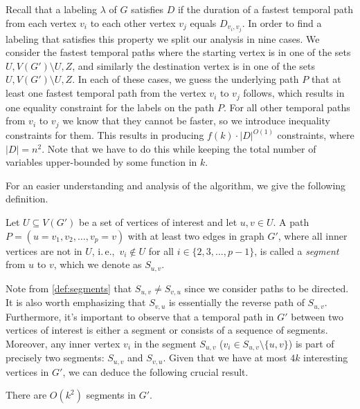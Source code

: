 \documentclass[a4paper,UKenglish,cleveref, autoref, thm-restate]{lipics-v2021}
\newcommand{\ie}{i.\,e.,\ }
\newcommand{\deltaExact}{\textsc{Simple TGR}}
\begin{document}
Recall that a labeling $\lambda$ of $G$ satisfies $D$ if the duration of a fastest temporal path from each vertex $v_i$ to each other vertex $v_j$ equals $D_{v_i, v_j}$.
In order to find a labeling that satisfies this property we split our analysis in nine cases.
We consider the fastest temporal paths 
where the starting vertex is in one of the sets $U,V(G') \setminus U, Z$,
and similarly the destination vertex is in one of the sets $U,V(G') \setminus U, Z$.
In each of these cases, we guess the underlying path $P$ that at least one fastest temporal path from the vertex $v_i$ to $v_j$ follows, 
which results in one equality constraint for the labels on the path $P$. 
For all other temporal paths from $v_i$ to $v_j$ we know that they cannot be faster, so we introduce inequality constraints for them.
This results in producing $f(k) \cdot |D| ^ {O(1)}$ constraints, where $|D|= n^2$. 
Note that we have to do this while keeping the total number of variables upper-bounded by some function in $k$.

For an easier understanding and analysis of the algorithm, we give the following definition.
\begin{definition}\label{def:segments}
    Let $U \subseteq V(G')$ be a set of vertices of interest and let $u,v \in U$.
    A path $P = (u=v_1,v_2, \dots, v_p = v)$  with at least two edges in graph $G'$, where all inner vertices are not in $U$, \ie $v_i \notin U$ for all $i \in \{ 2, 3, \dots, p-1\}$,
    is called a \emph{segment} from $u$ to $v$, which we denote as $S_{u,v}$.
\end{definition}
Note from \cref{def:segments} that $S_{u,v} \neq S_{v,u}$ since we consider paths to be directed. It is also worth emphasizing that $S_{v,u}$ is essentially the reverse path of $S_{u,v}$.
Furthermore, it's important to observe that a temporal path in $G'$ between two vertices of interest is either a segment or consists of a sequence of segments.
Moreover, any inner vertex $v_i$ in the segment $S_{u,v}$ ($v_i \in S_{u,v} \setminus \{u,v\}$) is part of precisely two segments: $S_{u,v}$ and $S_{v,u}$.
Given that we have at most $4k$ interesting vertices in $G'$, we can deduce the following crucial result.
\begin{corollary}\label{obs:FPT-k2segments}
    There are $O(k^2)$ segments in $G'$.
\end{corollary}
\end{document}
